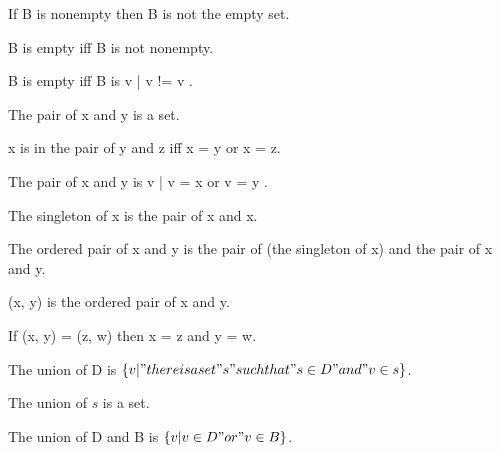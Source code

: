 \documentclass{article}
\begin{document}
\begin{forthel}
    \begin{lemma}
      If B is nonempty then B is not the empty set.
    \end{lemma}

    \begin{definition}
      B is empty iff B is not nonempty.
    \end{definition}

    \begin{lemma}
      B is empty iff B is { v | v != v }.
    \end{lemma}

    \begin{signature}
      The pair of x and y is a set.
    \end{signature}

    \begin{axiom}[Pair]
      x is in the pair of y and z iff x = y or x = z.
    \end{axiom}

    \begin{lemma}
      The pair of x and y is { v | v = x or v = y }.
    \end{lemma}

    \begin{definition}
      The singleton of x is the pair of x and x.
    \end{definition}

    \begin{definition}
      The ordered pair of x and y is the pair of (the singleton of x) and the pair of x and y.
    \end{definition}

    \begin{definition}
      (x, y) is the ordered pair of x and y.
    \end{definition}

    \begin{lemma}[OrdPair]
      If (x, y) = (z, w) then x = z and y = w.
    \end{lemma}

    \begin{definition}
      The union of D is $\{ v | "there is a set" s "such that" s \in D "and" v \in s \}$.
    \end{definition}

    \begin{axiom}[Union]
      The union of $s$ is a set.
    \end{axiom}

    \begin{definition}
      The union of D and B is $\{ v | v \in D "or" v \in B \}$.
    \end{definition}


\end{forthel}
\end{document}
